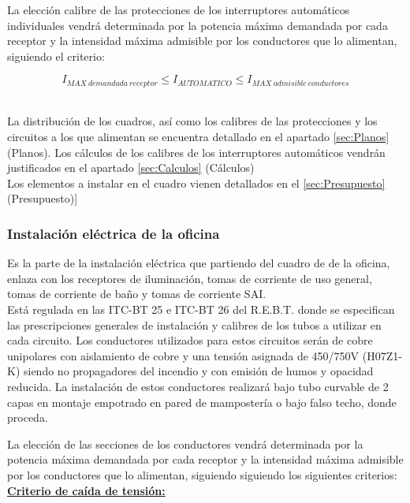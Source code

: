 La elección calibre de las protecciones de los interruptores automáticos individuales vendrá determinada por la potencia máxima demandada por cada receptor y la intensidad máxima admisible por los conductores que lo alimentan, siguiendo el criterio:\

$$ I_{MAX\ demandada\ receptor}\leq I_{AUTOMATICO}\leq I_{MAX\ admisible\ conductores}$$\

La distribución de los cuadros, así como los calibres de las protecciones y los circuitos a los que alimentan se encuentra detallado en el apartado \ref{sec:Planos} (Planos). Los cálculos de los calibres de los interruptores automáticos vendrán justificados en el apartado \ref{sec:Calculos} (Cálculos)\\

Los elementos a instalar en el cuadro vienen detallados en el \ref{sec:Presupuesto} (Presupuesto)]\

\subsubsection{Instalación eléctrica de la oficina}

Es la parte de la instalación eléctrica que partiendo del cuadro de de la oficina, enlaza con los receptores de iluminación, tomas de corriente de uso general, tomas de corriente de baño y tomas de corriente SAI.\\

Está regulada en las ITC-BT 25 e ITC-BT 26 del R.E.B.T. donde se especifican las prescripciones generales de instalación y calibres de los tubos a utilizar en cada circuito. Los conductores utilizados para estos circuitos serán de cobre unipolares con aislamiento de cobre y una tensión asignada de 450/750V (H07Z1-K) siendo no propagadores del incendio y con emisión de humos y opacidad reducida. La instalación de estos conductores realizará bajo tubo curvable de 2 capas en montaje empotrado en pared de mampostería o bajo falso techo, donde proceda.\\

\pagebreak

La elección de las secciones de los conductores vendrá determinada por la potencia máxima demandada por cada receptor y la intensidad máxima admisible por los conductores que lo alimentan, siguiendo siguiendo los siguientes criterios:\\

\underline{\bfseries Criterio de caída de tensión:}\

